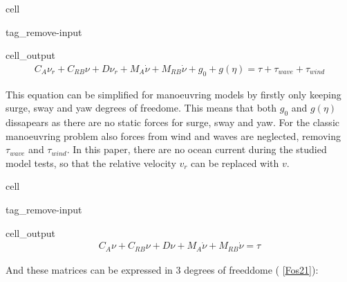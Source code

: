 \documentclass[review]{elsarticle}
\begin{document}
\begin{sphinxuseclass}{cell}
\begin{sphinxuseclass}{tag_remove-input}
\begin{sphinxuseclass}{cell_output}\begin{equation*}
\begin{split}\displaystyle C_{A} \nu_{r} + C_{RB} \nu + D \nu_{r} + M_{A} \dot{\nu} + M_{RB} \dot{\nu} + g_{0} + g{\left(\eta \right)} = \tau + \tau_{wave} + \tau_{wind}\end{split}
\end{equation*}
\end{sphinxuseclass}
\end{sphinxuseclass}
\end{sphinxuseclass}
\sphinxAtStartPar
This equation can be simplified for manoeuvring models by firstly only keeping surge, sway and yaw degrees of freedome. This means that both \(g_0\) and \(g(\eta)\) dissapears as there are no static forces for surge, sway and yaw. For the classic manoeuvring problem also forces from wind and waves are neglected, removing \(\tau_{wave}\) and \(\tau_{wind}\). In this paper, there are no ocean current during the studied model tests, so that the relative velocity \(v_r\) can be replaced with \(v\).

\begin{sphinxuseclass}{cell}
\begin{sphinxuseclass}{tag_remove-input}
\begin{sphinxuseclass}{cell_output}\begin{equation*}
\begin{split}\displaystyle C_{A} \nu + C_{RB} \nu + D \nu + M_{A} \dot{\nu} + M_{RB} \dot{\nu} = \tau\end{split}
\end{equation*}
\end{sphinxuseclass}
\end{sphinxuseclass}
\end{sphinxuseclass}
\sphinxAtStartPar
And these matrices can be expressed in 3 degrees of freeddome ( {[}\hyperlink{cite.bibligraphy:id167}{Fos21}{]}):
\end{document}
